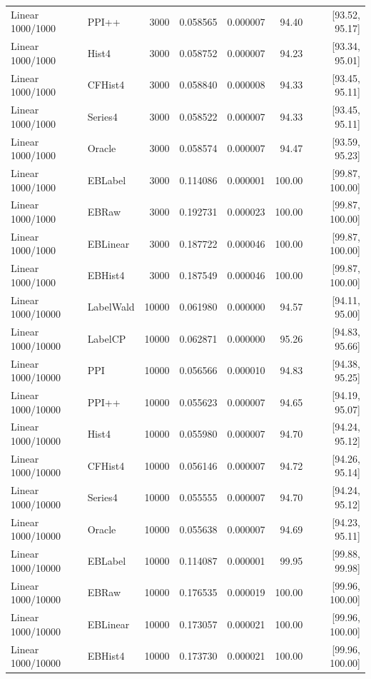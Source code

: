 \begin{longtable}{llrrrrr}
Linear 1000/1000 & PPI++ & 3000 & 0.058565 & 0.000007 & 94.40 & [93.52, 95.17]\\
Linear 1000/1000 & Hist4 & 3000 & 0.058752 & 0.000007 & 94.23 & [93.34, 95.01]\\
Linear 1000/1000 & CFHist4 & 3000 & 0.058840 & 0.000008 & 94.33 & [93.45, 95.11]\\
Linear 1000/1000 & Series4 & 3000 & 0.058522 & 0.000007 & 94.33 & [93.45, 95.11]\\
Linear 1000/1000 & Oracle & 3000 & 0.058574 & 0.000007 & 94.47 & [93.59, 95.23]\\
Linear 1000/1000 & EBLabel & 3000 & 0.114086 & 0.000001 & 100.00 & [99.87, 100.00]\\
Linear 1000/1000 & EBRaw & 3000 & 0.192731 & 0.000023 & 100.00 & [99.87, 100.00]\\
Linear 1000/1000 & EBLinear & 3000 & 0.187722 & 0.000046 & 100.00 & [99.87, 100.00]\\
Linear 1000/1000 & EBHist4 & 3000 & 0.187549 & 0.000046 & 100.00 & [99.87, 100.00]\\
Linear 1000/10000 & LabelWald & 10000 & 0.061980 & 0.000000 & 94.57 & [94.11, 95.00]\\
Linear 1000/10000 & LabelCP & 10000 & 0.062871 & 0.000000 & 95.26 & [94.83, 95.66]\\
Linear 1000/10000 & PPI & 10000 & 0.056566 & 0.000010 & 94.83 & [94.38, 95.25]\\
Linear 1000/10000 & PPI++ & 10000 & 0.055623 & 0.000007 & 94.65 & [94.19, 95.07]\\
Linear 1000/10000 & Hist4 & 10000 & 0.055980 & 0.000007 & 94.70 & [94.24, 95.12]\\
Linear 1000/10000 & CFHist4 & 10000 & 0.056146 & 0.000007 & 94.72 & [94.26, 95.14]\\
Linear 1000/10000 & Series4 & 10000 & 0.055555 & 0.000007 & 94.70 & [94.24, 95.12]\\
Linear 1000/10000 & Oracle & 10000 & 0.055638 & 0.000007 & 94.69 & [94.23, 95.11]\\
Linear 1000/10000 & EBLabel & 10000 & 0.114087 & 0.000001 & 99.95 & [99.88, 99.98]\\
Linear 1000/10000 & EBRaw & 10000 & 0.176535 & 0.000019 & 100.00 & [99.96, 100.00]\\
Linear 1000/10000 & EBLinear & 10000 & 0.173057 & 0.000021 & 100.00 & [99.96, 100.00]\\
Linear 1000/10000 & EBHist4 & 10000 & 0.173730 & 0.000021 & 100.00 & [99.96, 100.00]\\

\end{longtable}
